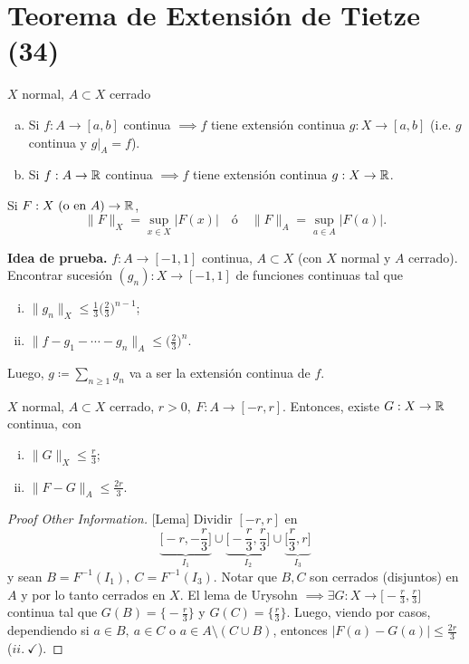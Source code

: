
\section{Teorema de Extensión de Tietze (34)}

\begin{theorem}
	$X$ normal, $A \subset X$ cerrado
	\begin{enumerate}[a)]
		\item Si $f : A \to [a,b]$ continua $\implies f$ tiene extensión continua $g : X \to [a,b]$ (i.e. $g$ continua y $g \big|_{A} = f$).

		\item Si $f : A \to \mathbb{R}$ continua $\implies f$ tiene extensión continua $g : X \to \mathbb{R}$.
	\end{enumerate}
\end{theorem}

\begin{notation}
	Si $F : X \ (\text{o en } A) \to \mathbb{R}$, 
	\[ \| F \|_{X} = \sup_{x \in X} |F(x)| \quad \text{ó} \quad \| F \|_{A} = \sup_{a \in A} |F(a)|. \]
\end{notation}

\noindent \textbf{Idea de prueba.} $f : A \to [-1,1]$ continua, $A \subset X$ (con $X$ normal y $A$ cerrado). Encontrar sucesión $(g_{n}) : X \to [-1,1]$ de funciones continuas tal que
\begin{enumerate}[i)]
	\item $\| g_{n} \|_{X} \leq \frac{1}{3}\big( \frac{2}{3} \big)^{n-1}$;

	\item $\| f - g_{1} - \cdots - g_{n} \|_{A} \leq \big( \frac{2}{3} \big)^{n}$.
\end{enumerate}
Luego, $g \coloneq \sum_{n \geq 1}^{} g_{n}$ va a ser la extensión continua de $f$.

\begin{lemma}
	$X$ normal, $A \subset X$ cerrado, $r > 0,\ F : A \to [-r,r]$. Entonces, existe $G : X \to \mathbb{R}$ continua, con
	\begin{enumerate}[i)]
		\item $\| G \|_{X} \leq \frac{r}{3}$;

		\item $\| F - G \|_{A} \leq \frac{2r}{3}$.
	\end{enumerate}
\end{lemma}
\begin{proof}[Proof Other Information][Lema]
	Dividir $[-r,r]$ en 
	\[ \underbrace{\Big[-r,-\frac{r}{3}\Big]}_{I_{1}} \cup \underbrace{\Big[-\frac{r}{3},\frac{r}{3}\Big]}_{I_{2}} \cup \underbrace{\Big[ \frac{r}{3},r \Big]}_{I_{3}} \]
	y sean $B = F^{-1}(I_{1}),\ C = F^{-1}(I_{3})$. Notar que $B,C$ son cerrados (disjuntos) en $A$ y por lo tanto cerrados en $X$. El lema de Urysohn $\implies \exists G : X \to \big[-\frac{r}{3},\frac{r}{3}\big]$ continua tal que $G(B) = \big\{-\frac{r}{3}\big\}  $ y $G(C) = \big\{\frac{r}{3}\big\}$. Luego, viendo por casos, dependiendo si $a \in B,\ a \in C$ o $a \in A \setminus (C \cup B)$, entonces $| F(a) - G(a) | \leq \frac{2r}{3}$ ($ii. \ \checkmark$).
\end{proof}

